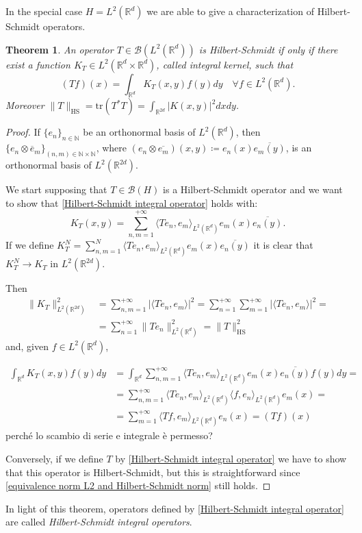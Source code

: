 \documentclass[corpo=11pt, stile=classica, tipotesi=custom,
greek, evenboxes, english]{toptesi}
\numberwithin{equation}{chapter}
\newtheorem{teo}{Theorem}[chapter] %
\theoremstyle{remark}
\newcommand{\R}{\mathbb{R}} %
\newcommand{\N}{\mathbb{N}} %
\newcommand{\B}{\mathscr{B}} %
\begin{document}
In the special case $H = L^2(\R^d)$ we are able to give a characterization of Hilbert-Schmidt operators.
\begin{teo}\label{representation of Hilbert-Schmidt integral operator}
	An operator $T \in \B(L^2(\R^d))$ is Hilbert-Schmidt if only if there exist a function $K_T \in L^2(\R^d \times \R^d)$, called integral kernel, such that
	\begin{equation}\label{Hilbert-Schmidt integral operator}
		(Tf)(x) = \int_{\R^d} K_T(x,y)f(y)dy \quad \forall f \in L^2(\R^d).
	\end{equation}
	Moreover $\|T\|_{\mathrm{HS}} = \mathrm{tr}(T^*T) = \int_{\R^{2d}} |K(x,y)|^2 dxdy$.
\end{teo}
\begin{proof}
	If $\{e_n\}_{n \in \N}$ be an orthonormal basis of $L^2(\R^d)$, then $\{e_n \otimes \overline{e}_m\}_{(n,m) \in \N \times \N}$, where $(e_n \otimes \overline{e_m})(x,y) \coloneqq e_n(x)\overline{e_m(y)}$, is an orthonormal basis of $L^2(\R^{2d})$.
	
	We start supposing that $T \in \B(H)$ is a Hilbert-Schmidt operator and we want to show that \eqref{Hilbert-Schmidt integral operator} holds with:
	\begin{equation}\label{integral kernel formula}
		K_T(x,y) = \sum_{n,m=1}^{+\infty} \langle Te_n,e_m \rangle_{L^2(\R^d)} e_m(x)\overline{e_n(y)}.
	\end{equation}
	If we define $K_T^N = \sum_{n,m=1}^{N} \langle Te_n,e_m \rangle_{L^2(\R^d)} e_m(x)\overline{e_n(y)}$ it is clear that $K_T^N \rightarrow K_T$ in $L^2(\R^{2d})$.

	Then
	\begin{equation}\label{equivalence norm L2 and Hilbert-Schmidt norm}
		\begin{aligned}
			\|K_T\|_{L^2(\R^{2d})}^2 &= \sum_{n,m=1}^{+\infty} |\langle Te_n,e_m \rangle|^2 = \sum_{n=1}^{+\infty} \sum_{m=1}^{+\infty} |\langle Te_n,e_m \rangle|^2 =\\
			&= \sum_{n=1}^{+\infty} \|T e_n\|^2_{L^2(\R^d)} = \|T\|_{\mathrm{HS}}^2
		\end{aligned}		
	\end{equation}
	and, given $f \in L^2(\R^d)$,
	{\color{red}\begin{align*}
			\int_{\R^d} K_T(x,y)f(y)dy &= \int_{\R^d} \sum_{n,m=1}^{+\infty} \langle Te_n,e_m \rangle_{L^2(\R^d)} e_m(x) \overline{e_n(y)}f(y)dy = \\
			&= \sum_{n,m=1}^{+\infty} \langle Te_n,e_m \rangle_{L^2(\R^d)} \langle f,e_n \rangle_{L^2(\R^d)} e_m(x) = \\
			&= \sum_{m=1}^{+\infty} \langle Tf,e_m \rangle_{L^2(\R^d)} e_n(x) = (Tf)(x)
		\end{align*} perché lo scambio di serie e integrale è permesso?
		
	Conversely, if we define $T$ by \eqref{Hilbert-Schmidt integral operator} we have to show that this operator is Hilbert-Schmidt, but this is straightforward since  \eqref{equivalence norm L2 and Hilbert-Schmidt norm} still holds.}
\end{proof}
In light of this theorem, operators defined by \eqref{Hilbert-Schmidt integral operator} are called \emph{Hilbert-Schmidt integral operators}.
\end{document}
